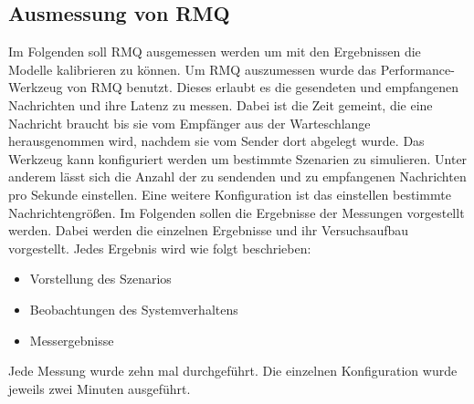 \subsection{Ausmessung von RMQ}
\label{sec:rmqBenchmark}
Im Folgenden soll RMQ ausgemessen werden um mit den Ergebnissen die Modelle kalibrieren zu können. Um RMQ auszumessen wurde das Performance-Werkzeug von RMQ benutzt. Dieses erlaubt es die gesendeten und empfangenen Nachrichten und ihre Latenz zu messen. Dabei ist die Zeit gemeint, die eine Nachricht braucht bis sie vom Empfänger aus der Warteschlange herausgenommen wird, nachdem sie vom Sender dort abgelegt wurde. Das Werkzeug kann konfiguriert werden um bestimmte Szenarien zu simulieren. Unter anderem lässt sich die Anzahl der zu sendenden und zu empfangenen Nachrichten pro Sekunde einstellen. Eine weitere Konfiguration ist das einstellen bestimmte Nachrichtengrößen. Im Folgenden sollen die Ergebnisse der Messungen vorgestellt werden. Dabei werden die einzelnen Ergebnisse und ihr Versuchsaufbau vorgestellt. Jedes Ergebnis wird wie folgt beschrieben: 
\begin{itemize}
    \item Vorstellung des Szenarios
    \item Beobachtungen des Systemverhaltens
    \item Messergebnisse
\end{itemize}
Jede Messung wurde zehn mal durchgeführt. Die einzelnen Konfiguration wurde jeweils zwei Minuten ausgeführt. 



